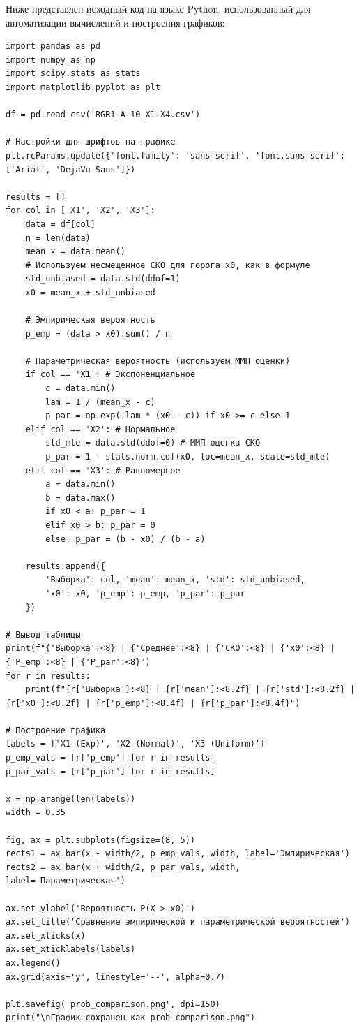 \documentclass[a4paper,12pt]{article}
\begin{document}
Ниже представлен исходный код на языке Python, использованный для автоматизации вычислений и построения графиков:

\begin{lstlisting}[style=mycpp, caption={Содержание файла 9\_probability\_calculation.py}]
import pandas as pd
import numpy as np
import scipy.stats as stats
import matplotlib.pyplot as plt

df = pd.read_csv('RGR1_A-10_X1-X4.csv')

# Настройки для шрифтов на графике
plt.rcParams.update({'font.family': 'sans-serif', 'font.sans-serif': ['Arial', 'DejaVu Sans']})

results = []
for col in ['X1', 'X2', 'X3']:
    data = df[col]
    n = len(data)
    mean_x = data.mean()
    # Используем несмещенное СКО для порога x0, как в формуле
    std_unbiased = data.std(ddof=1) 
    x0 = mean_x + std_unbiased
    
    # Эмпирическая вероятность
    p_emp = (data > x0).sum() / n
    
    # Параметрическая вероятность (используем ММП оценки)
    if col == 'X1': # Экспоненциальное
        c = data.min()
        lam = 1 / (mean_x - c)
        p_par = np.exp(-lam * (x0 - c)) if x0 >= c else 1
    elif col == 'X2': # Нормальное
        std_mle = data.std(ddof=0) # ММП оценка СКО
        p_par = 1 - stats.norm.cdf(x0, loc=mean_x, scale=std_mle)
    elif col == 'X3': # Равномерное
        a = data.min()
        b = data.max()
        if x0 < a: p_par = 1
        elif x0 > b: p_par = 0
        else: p_par = (b - x0) / (b - a)
        
    results.append({
        'Выборка': col, 'mean': mean_x, 'std': std_unbiased, 
        'x0': x0, 'p_emp': p_emp, 'p_par': p_par
    })

# Вывод таблицы
print(f"{'Выборка':<8} | {'Среднее':<8} | {'СКО':<8} | {'x0':<8} | {'P_emp':<8} | {'P_par':<8}")
for r in results:
    print(f"{r['Выборка']:<8} | {r['mean']:<8.2f} | {r['std']:<8.2f} | {r['x0']:<8.2f} | {r['p_emp']:<8.4f} | {r['p_par']:<8.4f}")

# Построение графика
labels = ['X1 (Exp)', 'X2 (Normal)', 'X3 (Uniform)']
p_emp_vals = [r['p_emp'] for r in results]
p_par_vals = [r['p_par'] for r in results]

x = np.arange(len(labels))
width = 0.35

fig, ax = plt.subplots(figsize=(8, 5))
rects1 = ax.bar(x - width/2, p_emp_vals, width, label='Эмпирическая')
rects2 = ax.bar(x + width/2, p_par_vals, width, label='Параметрическая')

ax.set_ylabel('Вероятность P(X > x0)')
ax.set_title('Сравнение эмпирической и параметрической вероятностей')
ax.set_xticks(x)
ax.set_xticklabels(labels)
ax.legend()
ax.grid(axis='y', linestyle='--', alpha=0.7)

plt.savefig('prob_comparison.png', dpi=150)
print("\nГрафик сохранен как prob_comparison.png")
\end{lstlisting}
\end{document}
